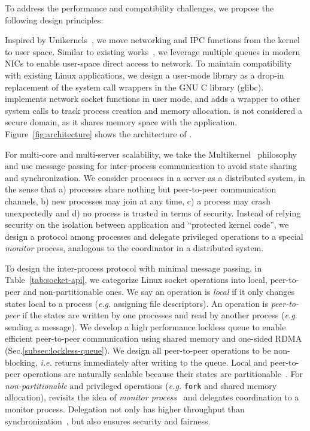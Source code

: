 To address the performance and compatibility challenges, we propose the following design principles:

Inspired by Unikernels~\cite{madhavapeddy2013unikernels}, we move networking and IPC functions from the kernel to user space. Similar to existing works~\cite{peter2016arrakis,jeong2014mtcp,libvma}, we leverage multiple queues in modern NICs to enable user-space direct access to network. %
To maintain compatibility with existing Linux applications, we design a user-mode library \libipc as a drop-in replacement of the system call wrappers in the GNU C library (glibc). \libipc{} implements network socket functions in user mode, and adds a wrapper to other system calls to track process creation and memory allocation. \libipc{} is not considered a secure domain, as it shares memory space with the application. Figure~\ref{fig:architecture} shows the architecture of \sys{}.

For multi-core and multi-server scalability, we take the Multikernel~\cite{baumann2009multikernel} philosophy and use message passing for inter-process communication to avoid state sharing and synchronization. We consider processes in a server as a distributed system, in the sense that a) processes share nothing but peer-to-peer communication channels, b) new processes may join at any time, c) a process may crash unexpectedly and d) no process is trusted in terms of security. Instead of relying security on the isolation between application and ``protected kernel code'', we design a protocol among processes and delegate privileged operations to a special \textit{monitor} process, analogous to the coordinator in a distributed system.

To design the inter-process protocol with minimal message passing, in Table~\ref{tab:socket-api}, we categorize Linux socket operations into local, peer-to-peer and non-partitionable ones. We say an operation is \textit{local} if it only changes states local to a process (\textit{e.g.} assigning file descriptors). An operation is \textit{peer-to-peer} if the states are written by one processes and read by another process (\textit{e.g.} sending a message). We develop a high performance lockless queue to enable efficient peer-to-peer communication using shared memory and one-sided RDMA (Sec.\ref{subsec:lockless-queue}). We design all peer-to-peer operations to be non-blocking, \textit{i.e.} returns immediately after writing to the queue. Local and peer-to-peer operations are naturally scalable because their states are partitionable~\cite{partitionable}. For \textit{non-partitionable} and privileged operations (\textit{e.g.} \texttt{fork} and shared memory allocation), \libipc revisits the idea of \textit{monitor process}~\cite{hoare1974monitors} and delegates coordination to a monitor process. Delegation not only has higher throughput than synchronization~\cite{roghanchi2017ffwd}, but also ensures security and fairness.

